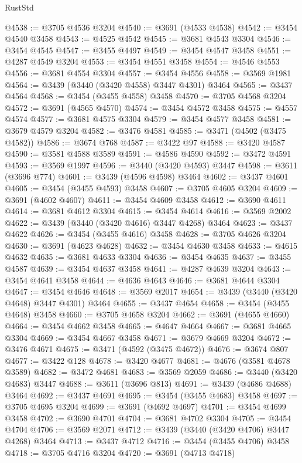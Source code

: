 \begin{lexlean}{RustStd}
\begin{coremodule}
{{{{{{{{{{{{{{{{{{{@4538 := @3705 @4536 @3204
@4540 := @3691 (@4533 @4538)
@4542 := @3454 @4540 @3458
@4543 := @4525 @4542
@4545 := @3681 @4543 @3304
@4546 := @3454 @4545
@4547 := @3455 @4497
@4549 := @3454 @4547 @3458
@4551 := @4287 @4549 @3204
@4553 := @3454 @4551 @3458
@4554 := @4546 @4553
@4556 := @3681 @4554 @3304
@4557 := @3454 @4556
@4558 := @3569 @1981
@4564 := @3439 (@3440 (@3420 @4558) @3447 @4301) @3464
@4565 := @3437 @4564
@4568 := @3454 (@3455 @4558) @3458
@4570 := @3705 @4568 @3204
@4572 := @3691 (@4565 @4570)
@4574 := @3454 @4572 @3458
@4575 := @4557 @4574
@4577 := @3681 @4575 @3304
@4579 := @3454 @4577 @3458
@4581 := @3679 @4579 @3204
@4582 := @3476 @4581
@4585 := @3471 (@4502 (@3475 @4582))
@4586 := @3674 @768
@4587 := @3422 @97
@4588 := @3420 @4587
@4590 := @3581 @4588 @3589
@4591 := @4586 @4590
@4592 := @3472 @4591
@4593 := @3569 @1997
@4596 := @3440 (@3420 @4593) @3447
@4598 := @3611 (@3696 @774)
@4601 := @3439 (@4596 @4598) @3464
@4602 := @3437 @4601
@4605 := @3454 (@3455 @4593) @3458
@4607 := @3705 @4605 @3204
@4609 := @3691 (@4602 @4607)
@4611 := @3454 @4609 @3458
@4612 := @3690 @4611
@4614 := @3681 @4612 @3304
@4615 := @3454 @4614
@4616 := @3569 @2002
@4622 := @3439 (@3440 (@3420 @4616) @3447 @4268) @3464
@4623 := @3437 @4622
@4626 := @3454 (@3455 @4616) @3458
@4628 := @3705 @4626 @3204
@4630 := @3691 (@4623 @4628)
@4632 := @3454 @4630 @3458
@4633 := @4615 @4632
@4635 := @3681 @4633 @3304
@4636 := @3454 @4635
@4637 := @3455 @4587
@4639 := @3454 @4637 @3458
@4641 := @4287 @4639 @3204
@4643 := @3454 @4641 @3458
@4644 := @4636 @4643
@4646 := @3681 @4644 @3304
@4647 := @3454 @4646
@4648 := @3569 @2017
@4654 := @3439 (@3440 (@3420 @4648) @3447 @4301) @3464
@4655 := @3437 @4654
@4658 := @3454 (@3455 @4648) @3458
@4660 := @3705 @4658 @3204
@4662 := @3691 (@4655 @4660)
@4664 := @3454 @4662 @3458
@4665 := @4647 @4664
@4667 := @3681 @4665 @3304
@4669 := @3454 @4667 @3458
@4671 := @3679 @4669 @3204
@4672 := @3476 @4671
@4675 := @3471 (@4592 (@3475 @4672))
@4676 := @3674 @807
@4677 := @3422 @128
@4678 := @3420 @4677
@4681 := @4676 (@3581 @4678 @3589)
@4682 := @3472 @4681
@4683 := @3569 @2059
@4686 := @3440 (@3420 @4683) @3447
@4688 := @3611 (@3696 @813)
@4691 := @3439 (@4686 @4688) @3464
@4692 := @3437 @4691
@4695 := @3454 (@3455 @4683) @3458
@4697 := @3705 @4695 @3204
@4699 := @3691 (@4692 @4697)
@4701 := @3454 @4699 @3458
@4702 := @3690 @4701
@4704 := @3681 @4702 @3304
@4705 := @3454 @4704
@4706 := @3569 @2071
@4712 := @3439 (@3440 (@3420 @4706) @3447 @4268) @3464
@4713 := @3437 @4712
@4716 := @3454 (@3455 @4706) @3458
@4718 := @3705 @4716 @3204
@4720 := @3691 (@4713 @4718)
}}}}}}}}}}}}}}}}}}}
\end{coremodule}
\end{lexlean}
